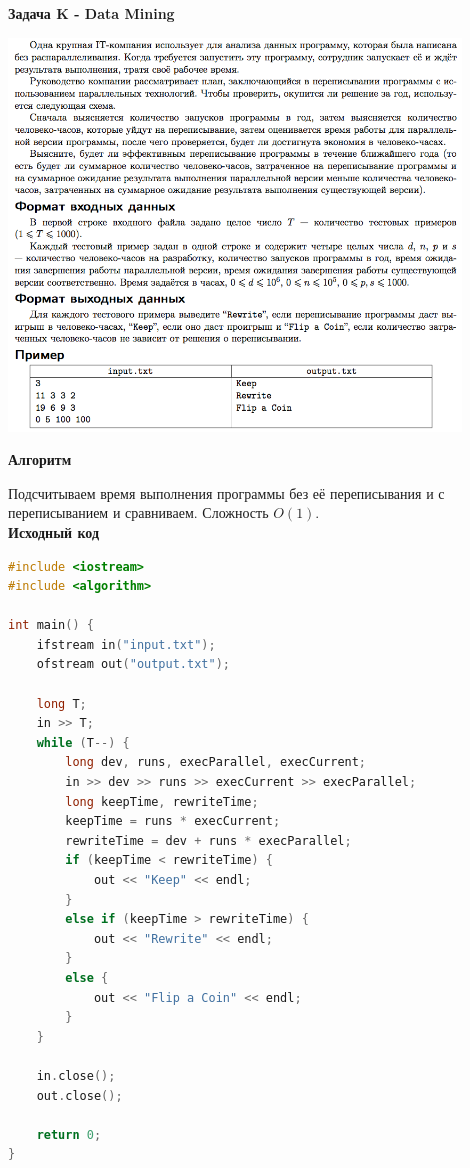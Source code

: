 \documentclass[a4paper,12pt]{article}
\begin{document}
\newpage
\textbf{{\large Задача K - Data Mining}}

\begin{center}
\includegraphics[width=0.9\textwidth]{OC_Udmurtia/OC_Udmurtia_K.png}\\ [1cm]
\end{center}

\newpage
\textbf{{\large Алгоритм}}

Подсчитываем время выполнения программы без её переписывания и с переписыванием и сравниваем. Сложность $O(1)$. \\

\textbf{{\large Исходный код}} \\
\begin{lstlisting}[language=C++]
#include <iostream>
#include <algorithm>

int main() {
    ifstream in("input.txt");
    ofstream out("output.txt");

    long T;
    in >> T;
    while (T--) {
        long dev, runs, execParallel, execCurrent;
        in >> dev >> runs >> execCurrent >> execParallel;
        long keepTime, rewriteTime;
        keepTime = runs * execCurrent;
        rewriteTime = dev + runs * execParallel;
        if (keepTime < rewriteTime) {
            out << "Keep" << endl;
        }
        else if (keepTime > rewriteTime) {
            out << "Rewrite" << endl;
        }
        else {
            out << "Flip a Coin" << endl;
        }
    }

    in.close();
    out.close();

    return 0;
}
\end{lstlisting}
\end{document}
